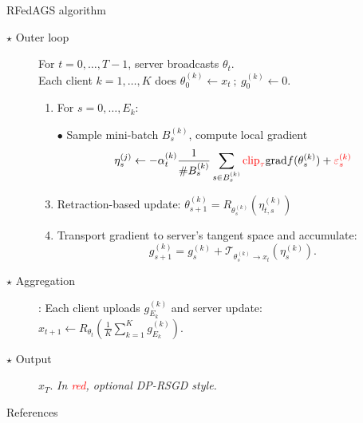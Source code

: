 \documentclass[aspectratio=169,xcolor=dvipsnames]{beamer}
\begin{document}
\begin{frame}{RFedAGS algorithm}
\begin{description}
\item[$\star$ Outer loop] For $t=0,\dots, T-1$, server broadcasts $\theta_t$. \\Each client $k=1,\dots, K$ does $\theta_{0}^{(k)} \leftarrow x_t~;~g_{0}^{(k)}\leftarrow 0$.
\begin{enumerate}
\item For $s=0,\dots, E_k$: 
\item[$\bullet$] Sample mini-batch $B_{s}^{(k)}$, compute local gradient
$$\eta_{s}^{(j)}\leftarrow -\alpha_t^{(k)}\frac{1}{\#B_s^{(k)}}\sum_{s\in B_{s}^{(k)}}\textcolor{red}{\text{clip}_{\tau}}\text{grad}f(\theta_{s}^{(k)})+\textcolor{red}{\varepsilon_{s}^{(k)}}$$
\item Retraction-based update: $\theta_{s+1}^{(k)}=R_{\theta_{s}^{(k)}}(\eta_{t,s}^{(k)})$
\item Transport gradient to server's tangent space and accumulate:
$$g_{s+1}^{(k)}=g_{s}^{(k)}+\mathcal{T}_{ \theta_{s}^{(k)}\to x_t}(\eta_{s}^{(k)}).$$
\end{enumerate}
\item[$\star$ Aggregation]:
 Each client uploads $g_{E_k}^{(k)}$ and server update: $x_{t+1}\leftarrow R_{\theta_t}\left(\frac{1}{K}\sum_{k=1}^{K}g_{E_k}^{(k)}\right).$
\item[$\star$ Output] $x_T$. \textit{In \textcolor{red}{red}, optional DP-RSGD style.}
\end{description}

\end{frame}

\begin{frame}{References}
\tiny


\end{frame}
\end{document}
